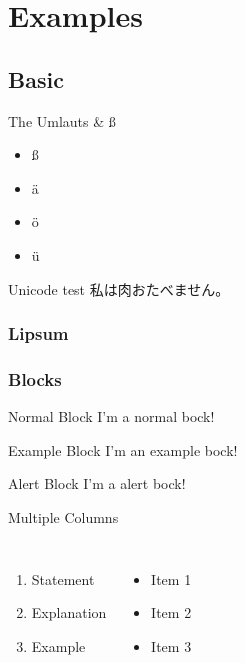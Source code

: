 \section{Examples}
\subsection{Basic}

\begin{frame}{The Umlauts \& ß}
	\begin{itemize}
		\item ß
		\item ä
		\item ö
		\item ü
	\end{itemize}
\end{frame}
\begin{frame}{Unicode test}
	\centering
	私は肉おたべません。
\end{frame}

\begin{frame}
	\frametitle{Lipsum}
	\centering
	\lipsum[1]
\end{frame}

\begin{frame}
	\frametitle{Blocks}
	\begin{block}{Normal Block}
		I'm a normal bock!
	\end{block}
	\begin{exampleblock}{Example Block}
		I'm an example bock!
	\end{exampleblock}
	\begin{alertblock}{Alert Block}
		I'm a alert bock!
	\end{alertblock}
\end{frame}

\begin{frame}{Multiple Columns}
    \begin{columns}[c]
        \begin{enumerate}
            \item Statement
            \item Explanation
            \item Example
        \end{enumerate}

        \begin{itemize}
			\item Item 1
			\item Item 2
			\item Item 3
		\end{itemize}

    \end{columns}
\end{frame}

